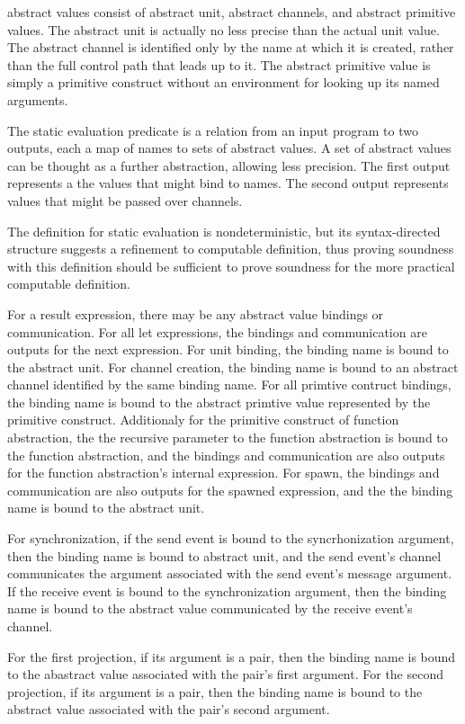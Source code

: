 \documentclass{article}
\begin{document}
abstract values consist of abstract unit, abstract channels, and abstract primitive values.
The abstract unit is actually no less precise than the actual unit value.  The abstract channel
is identified only by the name at which it is created, rather than the full control path that
leads up to it.  The abstract primitive value is simply a primitive construct without an
environment for looking up its named arguments. 

The static evaluation predicate is a relation from an input program to two outputs, each a map
of names to sets of abstract values.  A set of abstract values can be thought as a further
abstraction, allowing less precision. The first output represents a the values that might bind
to names.  The second output represents values that might be passed over channels.

The definition for static evaluation is nondeterministic, but its syntax-directed structure
suggests a refinement to computable definition, thus proving soundness with this definition
should be sufficient to prove soundness for the more practical computable definition.

For a result expression, there may be any abstract value bindings or communication. For all let
expressions, the bindings and communication are outputs for the next expression. For unit
binding, the binding name is bound to the abstract unit. For channel creation, the binding name
is bound to an abstract channel identified by the same binding name. For all primtive contruct
bindings, the binding name is bound to the abstract primtive value represented by the primitive
construct.  Additionaly for the primitive construct of function abstraction, the the recursive
parameter to the function abstraction is bound to the function abstraction, and the bindings
and communication are also outputs for the function abstraction's internal expression. For
spawn, the bindings and communication are also outputs for the spawned expression, and the the
binding name is bound to the abstract unit.

For synchronization, if the send event is bound to the syncrhonization argument, then the
binding name is bound to abstract unit, and the send event's channel communicates the argument
associated with the send event's message argument.  If the receive event is bound to the
synchronization argument, then the binding name is bound to the abstract value communicated by
the receive event's channel.

For the first projection, if its argument is a pair, then the binding name is bound to the
abastract value associated with the pair's first argument.  For the second projection, if its
argument is a pair, then the binding name is bound to the abstract value associated with the
pair's second argument.  
\end{document}
